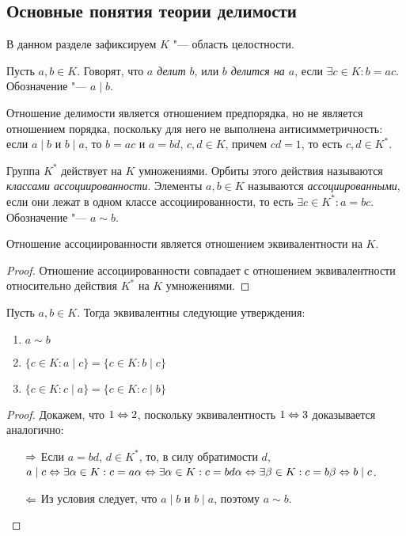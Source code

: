 \subsection{Основные понятия теории делимости}

В данном разделе зафиксируем $K$ "--- область целостности.

\begin{definition}
	Пусть $a, b \in K$. Говорят, что \textit{$a$ делит $b$}, или \textit{$b$ делится на $a$}, если $\exists c \in K: b = ac$. Обозначение "--- $a \mid b$.
\end{definition}

\begin{note}
	Отношение делимости является отношением предпорядка, но не является отношением порядка, поскольку для него не выполнена антисимметричность: если $a \mid b$ и $b \mid a$, то $b = ac$ и $a = bd$, $c, d \in K$, причем $cd = 1$, то есть $c, d \in K^*$.
\end{note}

\begin{definition}
	Группа $K^*$ действует на $K$ умножениями. Орбиты этого действия называются \textit{классами ассоциированности}. Элементы $a, b \in K$ называются \textit{ассоциированными}, если они лежат в одном классе ассоциированности, то есть $\exists c \in K^*: a = bc$. Обозначение "--- $a \sim b$.
\end{definition}

\begin{proposition}
	Отношение ассоциированности является отношением эквивалентности на $K$.
\end{proposition}

\begin{proof}
	Отношение ассоциированности совпадает с отношением эквивалентности относительно действия $K^*$ на $K$ умножениями.
\end{proof}

\begin{proposition}
	Пусть $a, b \in K$. Тогда эквивалентны следующие утверждения:
	\begin{enumerate}
		\item $a \sim b$
		\item $\{c \in K: a \mid c\} = \{c \in K: b \mid c\}$
		\item $\{c \in K: c \mid a\} = \{c \in K: c \mid b\}$
	\end{enumerate}
\end{proposition}

\begin{proof} Докажем, что $1 \Leftrightarrow 2$, поскольку эквивалентность $1 \Leftrightarrow 3$ доказывается аналогично:
	\begin{itemize}
		\item[$\Rightarrow$] Если $a = bd$, $d \in K^*$, то, в силу обратимости $d$, $a \mid c \Leftrightarrow \exists \alpha \in K: c = a\alpha \Leftrightarrow \exists \alpha \in K: c = bd\alpha \Leftrightarrow \exists \beta \in K: c = b\beta \Leftrightarrow b \mid c$.
		\item[$\Leftarrow$] Из условия следует, что $a \mid b$ и $b \mid a$, поэтому $a \sim b$.\qedhere
	\end{itemize}
\end{proof}

